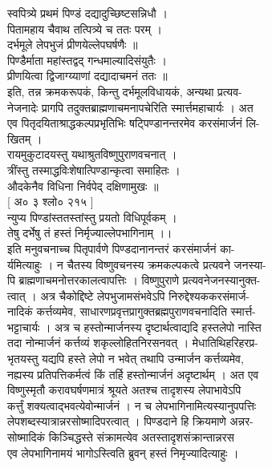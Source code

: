 \documentclass[11pt, openany]{book}
\begin{document}
{{{{{{{{{{{{{{{{{{{{{{{{{{{{{{{{{{{{{{{{{{{{{{{{{{{{{{{{{{{{{{{{{{ स्वपित्र्ये प्रथमं पिण्डं दद्यादुच्छिष्टसन्निधौ ।\\
पितामहाय चैवाथ तत्पित्र्ये च ततः परम् ।\\
दर्भमूले लेपभुजं प्रीणयेल्लेपघर्षणैः ॥\\
पिण्डैर्माता महांस्तद्वद् गन्धमाल्यादिसंयुतैः ।\\
प्रीणयित्वा द्विजाग्य्याणां दद्यादाचमनं ततः ॥\\
इति, तन्न क्रमकरूपकं, किन्तु दर्भमूलविधायकं, अन्यथा प्रत्यव-\\
नेजनादेः प्रागपि तदुक्तब्राह्मणाचमनापचेरिति स्मार्त्तमहाचार्यः । अत\\
एव पितृदयिताश्राद्धकल्पप्रभृतिभिः षट्पिण्डानन्तरमेव करसंमार्जनं लि-\\
खितम् ।\\
रायमुकुटादयस्तु यथाश्रुतविष्णुपुराणवचनात् ।\\
त्रींस्तु तस्माद्धविःशेषात्पिण्डान्कृत्वा समाहितः ।\\
औदकेनैव विधिना निर्वपेद् दक्षिणामुखः ॥\\
{[} अ० ३ श्लो० २१५ {]}\\
न्युप्य पिण्डांस्ततस्तांस्तु प्रयतो विधिपूर्वकम् ।\\
तेषु दर्भेषु तं हस्तं निर्मृज्याल्लेपभागिनाम् ।।\\
इति मनुवचनाच्च पितृपार्वणे पिण्डदानानन्तरं करसंमार्जनं का-\\
र्यमित्याहुः । न चैतस्य विष्णुवचनस्य क्रमकल्पकत्वे प्रत्यवने जनस्या-\\
पि ब्राह्मणाचमनोत्तरकालत्वापत्तिः । विष्णुपुराणे प्रत्यवनेजनस्यानुक्त-\\
त्वात् । अत्र चैकोद्दिष्टे लेपभुजामसंभवेऽपि निरुद्देश्यककरसंमार्ज-\\
नादिकं कर्त्तव्यमेव, साधारणप्रवृत्तप्रागुक्तब्रह्मपुराणवचनादिति
स्मार्त्त-\\
भट्टाचार्यः । अत्र च हस्तोन्मार्जनस्य दृष्टार्थत्वाद्यदि हस्तलेपो
नास्ति\\
तदा नोन्मार्जनं कर्त्तव्यं शकृल्लोहितनिरसनवत् । मेधातिथिहरिहरप्र-\\
भृतयस्तु यद्यपि हस्ते लेपो न भवेत् तथापि उन्मार्जन कर्त्तव्यमेव,\\
नह्यस्य प्रतिपत्तिकर्मत्वं किं तर्हि हस्तोन्मार्जनं अदृष्टार्थम् । अत
एव\\
विष्णुस्मृतौ करावघर्षणमात्रं श्रूयते अतश्च तादृशस्य लेपाभावेऽपि\\
कर्त्तुं शक्यत्वाद्भवत्येवोन्मार्जनं । न च लेपभागिनामित्यस्यानुपपत्तिः\\
लेपशब्दस्यात्रान्नरसोष्मादिपरत्वात् । पिण्डदाने हि क्रियमाणे अन्नर-\\
सोष्मादिकं किञ्चिद्धस्ते संक्रामत्येव अतस्तादृशसंक्रान्तान्नरस\\
एव लेपभागिनामयं भागोऽस्त्विति ब्रुवन् हस्तं निमृज्यादित्याहुः ।\\


}}}}}}}}}}}}}}}}}}}}}}}}}}}}}}}}}}}}}}}}}}}}}}}}}}}}}}}}}}}}}}}}}}
\end{document}
